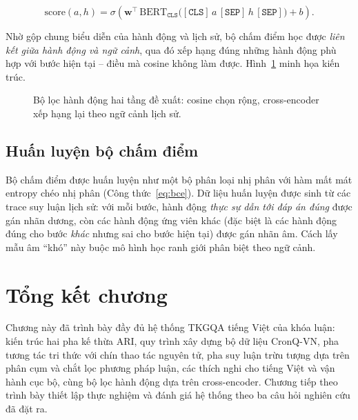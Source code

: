 \begin{equation}
\label{eq:ce-score}
\mathrm{score}(a, h) = \sigma\!\left(\mathbf{w}^{\top}\,
\mathrm{BERT}_{\mathtt{CLS}}\big([\mathtt{CLS}]\,a\,[\mathtt{SEP}]\,h\,[\mathtt{SEP}]\big) + b\right).
\end{equation}

Nhờ gộp chung biểu diễn của hành động và lịch sử, bộ chấm điểm học được \emph{liên kết giữa hành
động và ngữ cảnh}, qua đó xếp hạng đúng những hành động phù hợp với bước hiện tại -- điều mà cosine
không làm được. Hình~\ref{fig:crossencoder} minh họa kiến trúc.

\begin{figure}[ht]
  \centering
  \caption{Bộ lọc hành động hai tầng đề xuất: cosine chọn rộng, cross-encoder xếp hạng lại theo ngữ
  cảnh lịch sử. }
  \label{fig:crossencoder}
\end{figure}

\subsection{Huấn luyện bộ chấm điểm}
\label{sec:ce-train}

Bộ chấm điểm được huấn luyện như một bộ phân loại nhị phân với hàm mất mát entropy chéo nhị phân
(Công thức~\eqref{eq:bce}). Dữ liệu huấn luyện được sinh từ các trace suy luận lịch sử: với mỗi
bước, hành động \emph{thực sự dẫn tới đáp án đúng} được gán nhãn dương, còn các hành động ứng viên
khác (đặc biệt là các hành động đúng cho bước \emph{khác} nhưng sai cho bước hiện tại) được gán nhãn
âm. Cách lấy mẫu âm ``khó'' này buộc mô hình học ranh giới phân biệt theo ngữ cảnh.

\section{Tổng kết chương}

Chương này đã trình bày đầy đủ hệ thống TKGQA tiếng Việt của khóa luận: kiến trúc hai pha kế thừa
ARI, quy trình xây dựng bộ dữ liệu CronQ-VN, pha tương tác tri thức với chín thao tác nguyên tử, pha
suy luận trừu tượng dựa trên phân cụm và chắt lọc phương pháp luận, các thích nghi cho tiếng Việt và
vận hành cục bộ, cùng bộ lọc hành động dựa trên cross-encoder. Chương tiếp theo trình bày thiết lập
thực nghiệm và đánh giá hệ thống theo ba câu hỏi nghiên cứu đã đặt ra.
